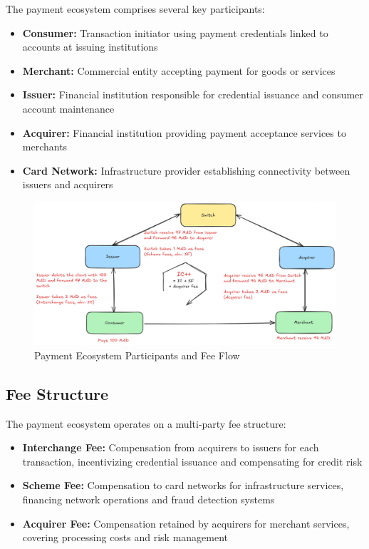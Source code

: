 The payment ecosystem comprises several key participants:

\begin{itemize}
   \item \textbf{Consumer:} Transaction initiator using payment credentials linked to accounts at issuing institutions
   \item \textbf{Merchant:} Commercial entity accepting payment for goods or services
   \item \textbf{Issuer:} Financial institution responsible for credential issuance and consumer account maintenance
   \item \textbf{Acquirer:} Financial institution providing payment acceptance services to merchants
   \item \textbf{Card Network:} Infrastructure provider establishing connectivity between issuers and acquirers
\end{itemize}

\begin{figure}[H]
    \centering
    \includegraphics[width=\textwidth]{img/Txn_Actors.png}
    \caption{Payment Ecosystem Participants and Fee Flow}
\end{figure}

\subsection{Fee Structure}

The payment ecosystem operates on a multi-party fee structure:

\begin{itemize}
   \item \textbf{Interchange Fee:} Compensation from acquirers to issuers for each transaction, incentivizing credential issuance and compensating for credit risk
   \item \textbf{Scheme Fee:} Compensation to card networks for infrastructure services, financing network operations and fraud detection systems
   \item \textbf{Acquirer Fee:} Compensation retained by acquirers for merchant services, covering processing costs and risk management
\end{itemize}

